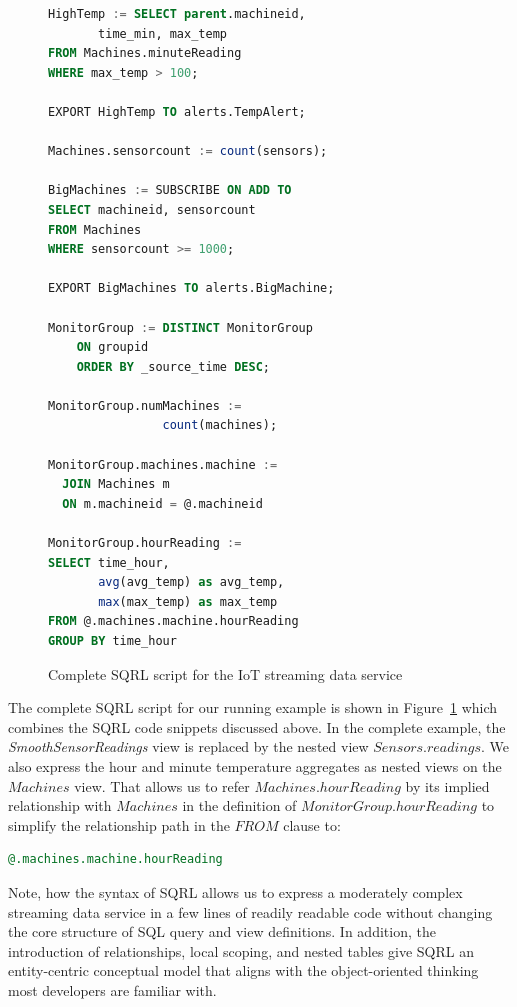 \documentclass[	DIV=calc,%
							paper=letter,%
							fontsize=11pt,%
							twocolumn]{scrartcl}	 					%
\begin{document}
\begin{figure}[!ht]
\begin{minipage}[r][][b]{1.0\columnwidth}
\begin{lstlisting}[language=SQL]
HighTemp := SELECT parent.machineid,
       time_min, max_temp
FROM Machines.minuteReading
WHERE max_temp > 100;

EXPORT HighTemp TO alerts.TempAlert;

Machines.sensorcount := count(sensors);

BigMachines := SUBSCRIBE ON ADD TO
SELECT machineid, sensorcount
FROM Machines
WHERE sensorcount >= 1000;

EXPORT BigMachines TO alerts.BigMachine;

MonitorGroup := DISTINCT MonitorGroup
    ON groupid
    ORDER BY _source_time DESC;

MonitorGroup.numMachines :=
                count(machines);

MonitorGroup.machines.machine :=
  JOIN Machines m
  ON m.machineid = @.machineid

MonitorGroup.hourReading :=
SELECT time_hour,
       avg(avg_temp) as avg_temp,
       max(max_temp) as max_temp
FROM @.machines.machine.hourReading
GROUP BY time_hour
    \end{lstlisting}
    \end{minipage}
\caption{Complete SQRL script for the IoT streaming data service}
\label{fig:complete_example}
\end{figure}

The complete SQRL script for our running example is shown in Figure~\ref{fig:complete_example} which combines the SQRL code snippets discussed above. In the complete example, the \emph{SmoothSensorReadings} view is replaced by the nested view $Sensors.readings$. We also express the hour and minute temperature aggregates as nested views on the $Machines$ view. That allows us to refer $Machines.hourReading$ by its implied relationship with $Machines$ in the definition of $MonitorGroup.hourReading$ to simplify the relationship path in the $FROM$ clause to:
\begin{lstlisting}[language=SQL]
@.machines.machine.hourReading
\end{lstlisting}

Note, how the syntax of SQRL allows us to express a moderately complex streaming data service in a few lines of readily readable code without changing the core structure of SQL query and view definitions. In addition, the introduction of relationships, local scoping, and nested tables give SQRL an entity-centric conceptual model that aligns with the object-oriented thinking most developers are familiar with.
\end{document}
